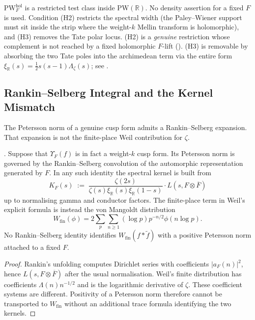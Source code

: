 \begin{remark}
\label{v4-arith:w5-a:rem:domain-PW-hol}
\(\mathrm{PW}^{\mathrm{hol}}_{F}\) is a restricted test class inside
\(\mathrm{PW}(\mathbb{R})\). No density assertion for a fixed \(F\) is
used. Condition (H2) restricts the spectral width (the Paley--Wiener
support must sit inside the strip where the weight-\(k\) Mellin
transform is holomorphic), and (H3) removes the Tate polar locus.
(H2) is a \emph{genuine} restriction whose complement is not reached
by a fixed holomorphic \(F\)-lift
(). (H3) is removable
by absorbing the two Tate poles into the archimedean term via the
entire form \(\xi_{\mathbb{R}}(s)=\frac{1}{2}s(s-1)\Lambda_{\zeta}(s)\);
see .
\end{remark}

\subsection{Rankin--Selberg Integral and the Kernel Mismatch}
\label{v4-arith:w5-a:mellin-lift:RS}

The Petersson norm of a genuine cusp form admits a Rankin--Selberg
expansion. That expansion is not the finite-place Weil contribution for
\(\zeta\).

\begin{theorem}
\label{v4-arith:w5-a:thm:RS-integral}
\ClaimStatusProvedHere. Suppose that \(\Upsilon_F(f)\) is in fact a
weight-\(k\) cusp form. Its Petersson norm is governed by the
Rankin--Selberg convolution of the automorphic representation generated
by \(F\). In any such identity the spectral kernel is built from
\begin{equation}
\label{v4-arith:w5-a:eq:KF-kernel}
K_{F}(s)\;:=\;\frac{\zeta(2s)}{\zeta(s)\xi_{\mathbb{R}}(s)\xi_{\mathbb{R}}(1-s)}\cdot L(s,F\otimes\overline{F})
\end{equation}
up to normalising gamma and conductor factors. The finite-place term in
Weil's explicit formula is instead the von Mangoldt distribution
\[
W_{\mathrm{fin}}(\phi)=2\sum_{p}\sum_{n\geq1}(\log p)p^{-n/2}\phi(n\log p).
\]
No Rankin--Selberg identity identifies \(W_{\mathrm{fin}}(f*\widetilde f)\)
with a positive Petersson norm attached to a fixed \(F\).
\end{theorem}

\begin{proof}
Rankin's unfolding computes Dirichlet series with coefficients
\(|a_F(n)|^2\), hence \(L(s,F\otimes\overline F)\) after the usual
normalisation. Weil's finite distribution has coefficients
\(\Lambda(n)n^{-1/2}\) and is the logarithmic derivative of \(\zeta\).
These coefficient systems are different. Positivity of a Petersson norm
therefore cannot be transported to \(W_{\mathrm{fin}}\) without an
additional trace formula identifying the two kernels.
\end{proof}

